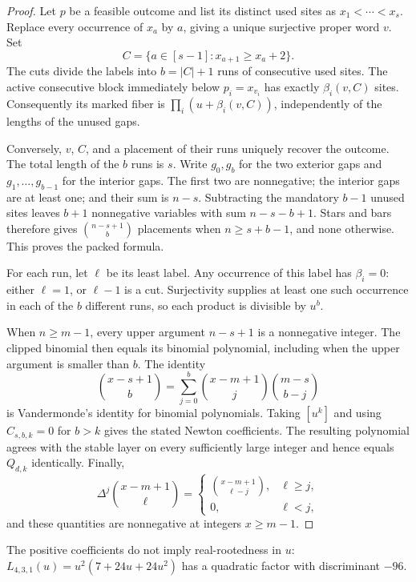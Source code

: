 \documentclass[11pt,a4paper]{article}
\begin{document}
\begin{proof}
Let $p$ be a feasible outcome and list its distinct used sites as
$x_1<\cdots<x_s$. Replace every occurrence of $x_a$ by $a$, giving a
unique surjective proper word $v$. Set
\[
 C=\{a\in[s-1]:x_{a+1}\ge x_a+2\}.
\]
The cuts divide the labels into $b=|C|+1$ runs of consecutive used
sites. The active consecutive block immediately below $p_i=x_{v_i}$
has exactly $\beta_i(v,C)$ sites. Consequently its marked fiber is
$\prod_i(u+\beta_i(v,C))$, independently of the lengths of the unused
gaps.

Conversely, $v$, $C$, and a placement of their runs uniquely recover
the outcome. The total length of the $b$ runs is $s$. Write $g_0,g_b$
for the two exterior gaps and $g_1,\ldots,g_{b-1}$ for the interior
gaps. The first two are nonnegative; the interior gaps are at least
one; and their sum is $n-s$. Subtracting the mandatory $b-1$ unused
sites leaves $b+1$ nonnegative variables with sum $n-s-b+1$.
Stars and bars therefore gives $\binom{n-s+1}{b}$ placements when
$n\ge s+b-1$, and none otherwise. This proves the packed formula.

For each run, let $\ell$ be its least label. Any occurrence of this
label has $\beta_i=0$: either $\ell=1$, or $\ell-1$ is a cut.
Surjectivity supplies at least one such occurrence in each of the
$b$ different runs, so each product is divisible by $u^b$.

When $n\ge m-1$, every upper argument $n-s+1$ is a nonnegative
integer. The clipped binomial then equals its binomial polynomial,
including when the upper argument is smaller than $b$. The identity
\[
 \binom{x-s+1}{b}
   =\sum_{j=0}^b\binom{x-m+1}{j}\binom{m-s}{b-j}
\]
is Vandermonde's identity for binomial polynomials. Taking $[u^k]$
and using $C_{s,b,k}=0$ for $b>k$ gives the stated Newton coefficients.
The resulting polynomial agrees with the stable layer on every
sufficiently large integer and hence equals $Q_{d,k}$ identically.
Finally,
\[
 \Delta^j\binom{x-m+1}{\ell}
   =\begin{cases}\binom{x-m+1}{\ell-j},&\ell\ge j,\\0,&\ell<j,
     \end{cases}
\]
and these quantities are nonnegative at integers $x\ge m-1$.
\end{proof}

\begin{remark}The positive coefficients do not imply real-rootedness in $u$: $L_{4,3,1}(u)=u^2(7+24u+24u^2)$ has a quadratic factor with discriminant $-96$.\end{remark}
\end{document}
